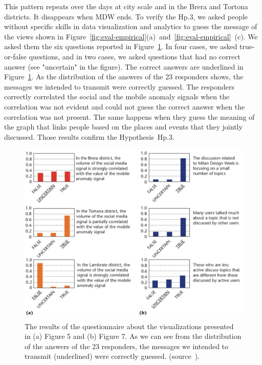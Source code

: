 This pattern repeats over the days at city scale and in the Brera and Tortona districts. It disappears when MDW ends.
To verify the \textsf{Hp.3}, we asked people without specific skills in data visualization and analytics to guess the message of the views shown in Figure~\ref{fig:eval-empirical}(a)~and~\ref{fig:eval-empirical}~(c). We asked them the six questions reported in Figure~\ref{fig:eval-empirical-quest}. In four cases, we asked true-or-false questions, and in two cases, we asked questions that had no correct answer (see "uncertain" in the figure). The correct answers are underlined in Figure~\ref{fig:eval-empirical-quest}. As the distribution of the answers of the 23 responders shows, the messages we intended to transmit were correctly guessed. The responders correctly correlated the social and the mobile anomaly signals when the correlation was not evident and could not guess the correct answer when the correlation was not present. The same happens when they guess the meaning of the graph that links people based on the places and events that they jointly discussed.
Those results confirm the Hypothesis~\textsf{Hp.3}.

\begin{figure}[t]
\centering
\includegraphics[width=.9\linewidth]{img/mdw-vis-7}
\caption{The results of the questionnaire about the visualizations presented in (a) Figure 5 and (b) Figure 7. As we can see from the distribution of the answers of the 23 responders, the messages we intended to transmit (underlined) were correctly guessed. (source~\cite{DBLP:journals/ieeemm/BalduiniVALAC15}).}
\label{fig:eval-empirical-quest}
\end{figure}

